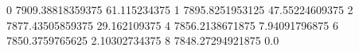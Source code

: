 0 7909.38818359375 61.115234375
1 7895.8251953125 47.55224609375
2 7877.43505859375 29.162109375
4 7856.2138671875 7.94091796875
6 7850.3759765625 2.10302734375
8 7848.27294921875 0.0
